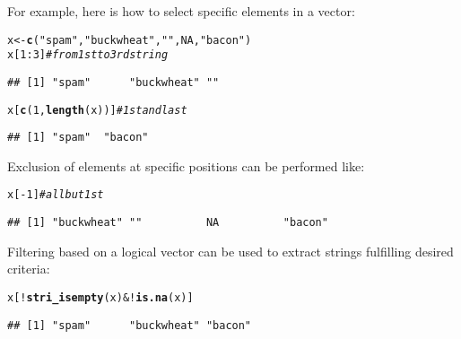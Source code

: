 \documentclass[nojss]{jss}\usepackage[]{graphicx}\usepackage[]{xcolor}
\makeatletter
\newcommand{\hlnum}[1]{\textcolor[rgb]{0.686,0.059,0.569}{#1}}%
\newcommand{\hlstr}[1]{\textcolor[rgb]{0.192,0.494,0.8}{#1}}%
\newcommand{\hlcom}[1]{\textcolor[rgb]{0.678,0.584,0.686}{\textit{#1}}}%
\newcommand{\hlopt}[1]{\textcolor[rgb]{0,0,0}{#1}}%
\newcommand{\hlstd}[1]{\textcolor[rgb]{0.345,0.345,0.345}{#1}}%
\newcommand{\hlkwb}[1]{\textcolor[rgb]{0.69,0.353,0.396}{#1}}%
\newcommand{\hlkwd}[1]{\textcolor[rgb]{0.737,0.353,0.396}{\textbf{#1}}}%
\newenvironment{kframe}{%
 \def\at@end@of@kframe{}%
 \ifinner\ifhmode%
  \def\at@end@of@kframe{\end{minipage}}%
  \begin{minipage}{\columnwidth}%
 \fi\fi%
 \def\FrameCommand##1{\hskip\@totalleftmargin \hskip-\fboxsep
 \colorbox{shadecolor}{##1}\hskip-\fboxsep
     \hskip-\linewidth \hskip-\@totalleftmargin \hskip\columnwidth}%
 \MakeFramed {\advance\hsize-\width
   \@totalleftmargin\z@ \linewidth\hsize
   \@setminipage}}%
 {\par\unskip\endMakeFramed%
 \at@end@of@kframe}
\newenvironment{knitrout}{}{} %
\makeatother
\begin{document}
For example, here is how to select specific elements in a vector:

\begin{knitrout}
\color{fgcolor}\begin{kframe}
\begin{alltt}
\hlstd{x} \hlkwb{<-} \hlkwd{c}\hlstd{(}\hlstr{"spam"}\hlstd{,} \hlstr{"buckwheat"}\hlstd{,} \hlstr{""}\hlstd{,} \hlnum{NA}\hlstd{,} \hlstr{"bacon"}\hlstd{)}
\hlstd{x[}\hlnum{1}\hlopt{:}\hlnum{3}\hlstd{]}                           \hlcom{# from 1st to 3rd string}
\end{alltt}
\begin{verbatim}
## [1] "spam"      "buckwheat" ""
\end{verbatim}
\begin{alltt}
\hlstd{x[}\hlkwd{c}\hlstd{(}\hlnum{1}\hlstd{,} \hlkwd{length}\hlstd{(x))]}               \hlcom{# 1st and last}
\end{alltt}
\begin{verbatim}
## [1] "spam"  "bacon"
\end{verbatim}
\end{kframe}
\end{knitrout}

\noindent
Exclusion of elements at specific positions can be performed like:

\begin{knitrout}
\color{fgcolor}\begin{kframe}
\begin{alltt}
\hlstd{x[}\hlopt{-}\hlnum{1}\hlstd{]}                            \hlcom{# all but 1st}
\end{alltt}
\begin{verbatim}
## [1] "buckwheat" ""          NA          "bacon"
\end{verbatim}
\end{kframe}
\end{knitrout}

\noindent
Filtering based on a logical vector can be used to extract
strings fulfilling desired criteria:

\begin{knitrout}
\color{fgcolor}\begin{kframe}
\begin{alltt}
\hlstd{x[}\hlopt{!}\hlkwd{stri_isempty}\hlstd{(x)} \hlopt{& !}\hlkwd{is.na}\hlstd{(x)]}
\end{alltt}
\begin{verbatim}
## [1] "spam"      "buckwheat" "bacon"
\end{verbatim}
\end{kframe}
\end{knitrout}
\end{document}
